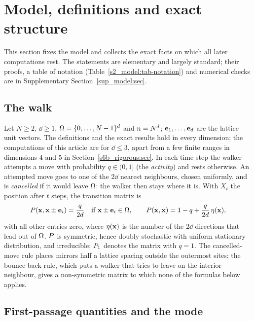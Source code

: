 \section{Model, definitions and exact structure}\label{s2_model:sec}

This section fixes the model and collects the exact facts on which all later computations rest. The statements are
elementary and largely standard; their proofs, a table of notation (Table~\ref{s2_model:tab-notation}) and numerical
checks are in Supplementary Section~\ref{sup_model:sec}.

\subsection{The walk}\label{s2_model:ssec-walk}

Let $N\ge2$, $\dd\ge1$, $\Omega=\{0,\dots,N-1\}^{d}$ and $n=N^{d}$; $\mathbf{e}_1,\dots,\mathbf{e}_{d}$ are the lattice unit
vectors. The definitions and the exact results hold in every dimension; the computations of this article are for
$\dd\le3$, apart from a few finite ranges in dimensions $4$ and $5$ in Section~\ref{s6b_rigorous:sec}. In each time step the walker attempts a move with probability $q\in(0,1]$ (the \emph{activity}) and rests
otherwise. An attempted move goes to one of the $2\dd$ nearest neighbours, chosen uniformly, and is \emph{cancelled}
if it would leave $\Omega$: the walker then stays where it is. With $X_t$ the position after $t$ steps, the transition
matrix is
\begin{equation}\label{s2_model:eq-P}
  P(\mathbf{x},\mathbf{x}\pm\mathbf{e}_i)=\frac{q}{2d}\quad\text{if }\mathbf{x}\pm\mathbf{e}_i\in\Omega,\qquad
  P(\mathbf{x},\mathbf{x})=1-q+\frac{q}{2d}\,\eta(\mathbf{x}),
\end{equation}
with all other entries zero, where $\eta(\mathbf{x})$ is the number of the $2\dd$ directions that lead out of $\Omega$. $P$ is
symmetric, hence doubly stochastic with uniform stationary distribution, and irreducible; $P_1$ denotes the matrix
with $q=1$. The cancelled-move rule places mirrors half a lattice spacing outside the outermost sites; the
bounce-back rule, which puts a walker that tries to leave on the interior neighbour, gives a non-symmetric matrix
to which none of the formulas below applies.

\subsection{First-passage quantities and the mode}\label{s2_model:ssec-fp}

